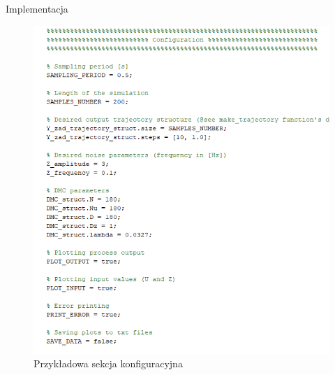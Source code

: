 
\begin{frame}{Implementacja}
    \begin{figure}
        \centering
        \includegraphics[scale=0.4]{img/Sekcja konfiguracyjna.PNG}
        \caption{Przykładowa sekcja konfiguracyjna}
    \end{figure}
\end{frame}

